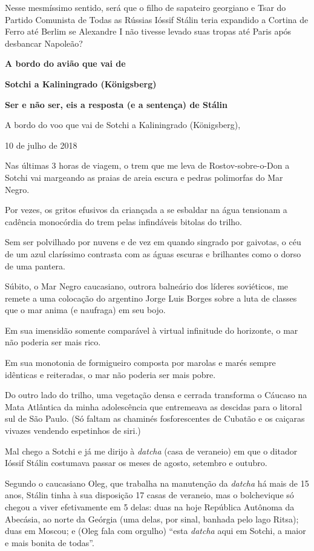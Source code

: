 Nesse mesmíssimo sentido, será que o filho de sapateiro georgiano e Tsar
do Partido Comunista de Todas as Rússias Ióssif Stálin teria expandido a
Cortina de Ferro até Berlim se Alexandre I não tivesse levado suas
tropas até Paris após desbancar Napoleão?

\textbf{A bordo do avião que vai de }

\textbf{Sotchi a Kaliningrado (Königsberg)}

\textbf{Ser e não ser, eis a resposta (e a sentença) de Stálin}

A bordo do voo que vai de Sotchi a Kaliningrado (Königsberg),

10 de julho de 2018

Nas últimas 3 horas de viagem, o trem que me leva de Rostov-sobre-o-Don
a Sotchi vai margeando as praias de areia escura e pedras polimorfas do
Mar Negro.

Por vezes, os gritos efusivos da criançada a se esbaldar na água
tensionam a cadência monocórdia do trem pelas infindáveis bitolas do
trilho.

Sem ser polvilhado por nuvens e de vez em quando singrado por gaivotas,
o céu de um azul claríssimo contrasta com as águas escuras e brilhantes
como o dorso de uma pantera.

Súbito, o Mar Negro caucasiano, outrora balneário dos líderes
soviéticos, me remete a uma colocação do argentino Jorge Luis Borges
sobre a luta de classes que o mar anima (e naufraga) em seu bojo.

Em sua imensidão somente comparável à virtual infinitude do horizonte, o
mar não poderia ser mais rico.

Em sua monotonia de formigueiro composta por marolas e marés sempre
idênticas e reiteradas, o mar não poderia ser mais pobre.

Do outro lado do trilho, uma vegetação densa e cerrada transforma o
Cáucaso na Mata Atlântica da minha adolescência que entremeava as
descidas para o litoral sul de São Paulo. (Só faltam as chaminés
fosforescentes de Cubatão e os caiçaras vivazes vendendo espetinhos de
siri.)

Mal chego a Sotchi e já me dirijo à \emph{datcha} (casa de veraneio) em
que o ditador Ióssif Stálin costumava passar os meses de agosto,
setembro e outubro.

Segundo o caucasiano Oleg, que trabalha na manutenção da \emph{datcha}
há mais de 15 anos, Stálin tinha à sua disposição 17 casas de veraneio,
mas o bolchevique só chegou a viver efetivamente em 5 delas: duas na
hoje República Autônoma da Abecásia, ao norte da Geórgia (uma delas, por
sinal, banhada pelo lago Ritsa); duas em Moscou; e (Oleg fala com
orgulho) ``esta \emph{datcha} aqui em Sotchi, a maior e mais bonita de
todas''.

